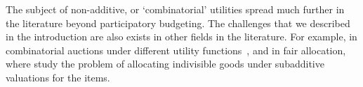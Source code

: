 \documentclass[runningheads]{llncs}
\newcommand{\kibitz}[2]{\ifnum\Comments=1{\color{#1}{#2}}\fi}
\newcommand{\rf}[1]{\kibitz{blue}{[Roy says:#1]}}
\begin{document}

The subject of non-additive, or `combinatorial' utilities spread much further in the literature beyond participatory budgeting. The challenges that we described in the introduction are also exists in other fields in the literature. For example, in combinatorial auctions under different utility functions~\citet{blumrosen2007combinatorial}, and in fair allocation, where \citet{chaudhury2021fair} study the problem of allocating indivisible goods under subadditive valuations for the items.




\end{document}
